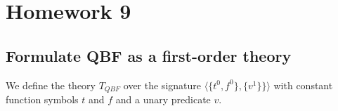 







\section{Homework 9}

\subsection{Formulate QBF as a first-order theory}
We define the theory $T_{QBF}$ over the signature $\langle \{t^0, f^0\}, \{v^1\} \}\rangle$ with constant function symbols $t$ and $f$ and a unary predicate $v$.

